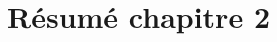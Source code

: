 \clearpage
\section*{Résumé chapitre 2}

\begin{otherlanguage}{french}
{\small

}
\end{otherlanguage}